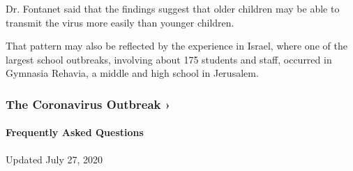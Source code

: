 Dr. Fontanet said that the findings suggest that older children may be
able to transmit the virus more easily than younger children.

That pattern may also be reflected by the experience in Israel, where
one of the largest school outbreaks, involving about 175 students and
staff, occurred in Gymnasia Rehavia, a middle and high school in
Jerusalem.

\href{https://www.nytimes3xbfgragh.onion/news-event/coronavirus?action=click\&pgtype=Article\&state=default\&region=MAIN_CONTENT_3\&context=storylines_faq}{}

\hypertarget{the-coronavirus-outbreak-}{%
\subsubsection{The Coronavirus Outbreak
›}\label{the-coronavirus-outbreak-}}

\hypertarget{frequently-asked-questions}{%
\paragraph{Frequently Asked
Questions}\label{frequently-asked-questions}}

Updated July 27, 2020

